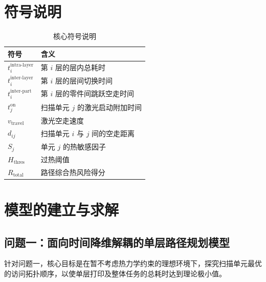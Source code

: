 \documentclass[a4paper, 12pt]{ctexart}
\begin{document}
\vspace{1em}
\section{符号说明}
\begin{table}[H]
    \centering
    \begin{tabular}{ll}
        \toprule
        符号 & 含义 \\
        \midrule
        $t^{\text{intra-layer}}_i$ & 第 $i$ 层的层内总耗时 \\
        $t^{\text{inter-layer}}_i$ & 第 $i$ 层的层间切换时间 \\
        $t^{\text{inter-part}}_i$ & 第 $i$ 层的零件间跳跃空走时间 \\
        $t^{\text{on}}_j$ & 扫描单元 $j$ 的激光启动附加时间 \\
        $v_{\text{travel}}$ & 激光空走速度 \\
        $d_{ij}$ & 扫描单元 $i$ 与 $j$ 间的空走距离 \\
        $S_j$ & 单元 $j$ 的热敏感因子 \\
        $H_{\text{thres}}$ & 过热阈值 \\
        $R_{\text{total}}$ & 路径综合热风险得分 \\
        \bottomrule
    \end{tabular}
    \caption{核心符号说明}
    \label{tab:core_symbols}
\end{table}

\vspace{1em}
\section{模型的建立与求解}
\vspace{0.5em}

\subsection{问题一：面向时间降维解耦的单层路径规划模型}
针对问题一，核心目标是在暂不考虑热力学约束的理想环境下，探究扫描单元最优的访问拓扑顺序，以使单层打印及整体任务的总耗时达到理论极小值。
\end{document}
